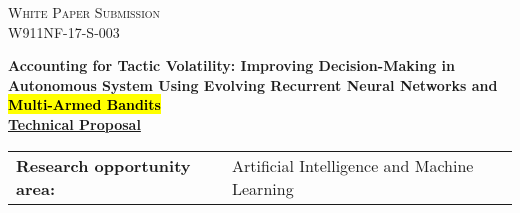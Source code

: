 \documentclass[12pt]{article}
\newcommand{\dan}[1]{\textcolor{blue}{{\it [Dan: #1]}}}
\newcommand{\Title}{Accounting for Tactic Volatility: Improving Decision-Making in Autonomous System Using Evolving Recurrent Neural Networks and \hl{Multi-Armed Bandits}}
\newcommand{\CallNumber}{W911NF-17-S-003} %
\newcommand{\CallName}{XXXX}
\begin{document}
\begin{titlepage}

\newcommand{\HRule}{\rule{\linewidth}{0.3mm}} %







\begin{center}
  \textsc{\Large White Paper Submission}\\[0.5cm] %
  \textsc{\large \CallNumber}\\[1.5cm]   %
\end{center}

\noindent \Large \textbf{\Title}\\[.10cm] 


\noindent \large  \underline{\textbf{Technical Proposal}}\\ [.15cm] 

\begin{tabular}{ L{50mm} L{100mm} }



\normalsize \textbf{Research opportunity area:} & \normalsize  Artificial Intelligence and Machine Learning  \\ 


\end{tabular}
\end{titlepage}
\end{document}
